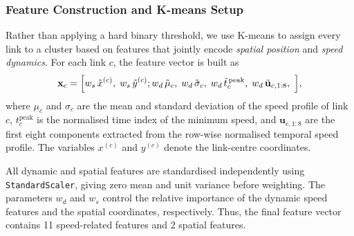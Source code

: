 \documentclass[11pt,a4paper]{article}
\begin{document}
\subsubsection{Feature Construction and K-means Setup}
\label{sec:methods:gridkmeans}

Rather than applying a hard binary threshold, we use K-means to assign every
link to a cluster based on features that jointly encode \emph{spatial position}
and \emph{speed dynamics}. For each link $c$, the feature vector is built as
\begin{equation}
  \mathbf{x}_c =
  \Bigl[
    w_s\,\tilde{x}^{(c)},\;
  w_s\,\tilde{y}^{(c)};
  w_d\,\tilde{\mu}_c,\;
  w_d\,\tilde{\sigma}_c,\;
  w_d\,\tilde{t}^{\,\mathrm{peak}}_c,\;
  w_d\,\tilde{\mathbf{u}}_{c,1:8},\
  \Bigr],
  \label{eq:kmeans_features}
\end{equation}
where $\mu_c$ and $\sigma_c$ are the mean and standard deviation of the speed
profile of link $c$, $t^{\mathrm{peak}}_c$ is the normalised time index of the
minimum speed, and $\mathbf{u}_{c,1:8}$ are the first eight components extracted
from the row-wise normalised temporal speed profile. The variables $x^{(c)}$
and $y^{(c)}$ denote the link-centre coordinates.

All dynamic and spatial features are standardised independently using
\texttt{StandardScaler}, giving zero mean and unit variance before weighting.
The parameters $w_d$ and $w_s$ control the relative importance of the dynamic
speed features and the spatial coordinates, respectively. Thus, the final
feature vector contains 11 speed-related features and 2 spatial features.
\end{document}
